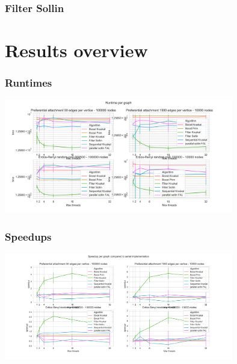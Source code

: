 \documentclass{beamer}
\begin{document}
\begin{frame}
\frametitle{Filter Sollin}

\end{frame}


\section{Results overview}

\begin{frame}
\frametitle{Runtimes}
\centering
\includegraphics[width=10cm]{Graph_runtime.png}
\end{frame}

\begin{frame}
\frametitle{Speedups}
\centering
\includegraphics[width=10cm]{Speedup.png}
\end{frame}


\begin{frame}
    \printbibliography
\end{frame} 
\end{document}
